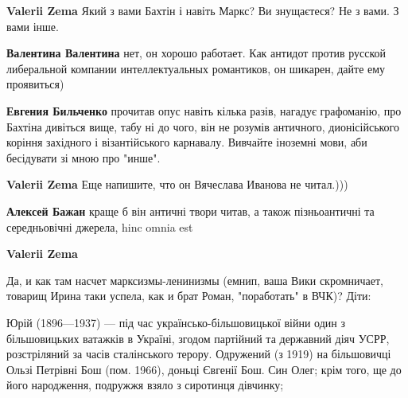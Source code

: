 \begin{itemize}
\begin{itemize}
\textbf{Valerii Zema} Який з вами Бахтін і навіть Маркс? Ви знущаєтеся? Не з вами. З вами інше.

 
\textbf{Валентина Валентина} нет, он хорошо работает. Как антидот против русской либеральной компании интеллектуальных романтиков, он шикарен, дайте ему проявиться)

 
\textbf{Евгения Бильченко} прочитав опус навіть кілька разів, нагадує графоманію, про Бахтіна дивіться вище, табу ні до чого, він не розумів античного, дионісійського коріння західного і візантійського карнавалу. Вивчайте іноземні мови, аби бесідувати зі мною про "инше".

 
\textbf{Valerii Zema} Еще напишите, что он Вячеслава Иванова не читал.)))

 
\textbf{Алексей Бажан} краще б він античні твори читав, а також пізньоантичні та середньовічні джерела, hinc omnia est

 
\textbf{Valerii Zema} 

Да, и как там насчет марксизмы-ленинизмы (емнип, ваша Вики скромничает, товарищ
Ирина таки успела, как и брат Роман, "поработать" в ВЧК)? Діти:

Юрій (1896—1937) — під час українсько-більшовицької війни один з більшовицьких
ватажків в Україні, згодом партійний та державний діяч УСРР, розстріляний за
часів сталінського терору. Одружений (з 1919) на більшовичці Ользі Петрівні Бош
(пом. 1966), доньці Євгенії Бош. Син Олег; крім того, ще до його народження,
подружжя взяло з сиротинця дівчинку;


\end{itemize}
\end{itemize}
